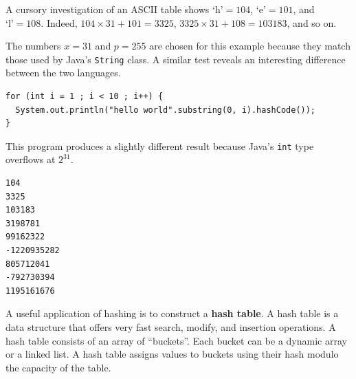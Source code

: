 \documentclass{book}
\begin{document}
A cursory investigation of an ASCII table shows $\textrm{`h'} = 104$,  $\textrm{`e'} = 101$, and $\textrm{`l'} = 108$. Indeed, $104 \times 31 + 101 = 3325$, $3325 \times 31 + 108 = 103183$, and so on.

The numbers $x=31$ and $p=255$ are chosen for this example because they match those used by Java's \texttt{String} class. A similar test reveals an interesting difference between the two languages.

\begin{lstlisting}
for (int i = 1 ; i < 10 ; i++) {
  System.out.println("hello world".substring(0, i).hashCode());
}
\end{lstlisting}

This program produces a slightly different result because Java's \texttt{int} type overflows at $2^31$.

\begin{lstlisting}
104
3325
103183
3198781
99162322
-1220935282
805712041
-792730394
1195161676
\end{lstlisting}

A useful application of hashing is to construct a \textbf{hash table}. A hash table is a data structure that offers very fast search, modify, and insertion operations. A hash table consists of an array of ``buckets''. Each bucket can be a dynamic array or a linked list. A hash table assigns values to buckets using their hash modulo the capacity of the table.
\end{document}
